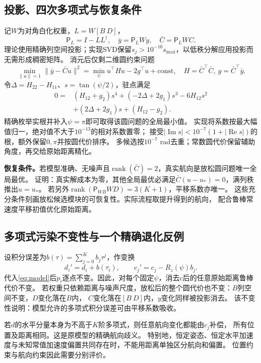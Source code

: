 \documentclass[11pt,a4paper]{ctexart}
\newcommand{\Proj}{\mathsf P}
\begin{document}
\subsection{投影、四次多项式与恢复条件}
记$W$为对角白化权重，$L=W[B\ D]$，
\begin{equation}
 \Proj_L=I-LL^\dagger,\quad \bar y=\Proj_LWy,\quad\bar C=\Proj_LWC.
\end{equation}
理论使用精确列空间投影；实现SVD保留$s_j>10^{-10}s_{\max}$，以低秩分解应用投影而无需形成稠密矩阵。
消元后仅剩二维圆约束问题
\begin{equation}
 \min_{\|u\|=1}\|\bar y-\bar C u\|^2
 =\min_\psi u^\top H u-2g^\top u+\mathrm{const},\quad
 H=\bar C^\top\bar C,\ g=\bar C^\top\bar y.
\end{equation}
令$\Delta=H_{22}-H_{11}$、$s=\tan(\psi/2)$，驻点满足
\begin{align}
0={}&(H_{12}+g_2)s^4+(-2\Delta+2g_1)s^3-6H_{12}s^2\nonumber\\
 &+(2\Delta+2g_1)s+(H_{12}-g_2).
\end{align}
精确枚举实根并补入$\psi=\pi$即可取得该圆问题的全局最小值。
实现将系数按最大幅值归一，绝对值不大于$10^{-13}$的相对系数置零；
接受$|\operatorname{Im}s|<10^{-7}(1+|\operatorname{Re}s|)$的根，额外保留$0,\pi$并按圆代价排序。
多候选按$10^{-7}$ rad去重；常数圆代价保留辅助角度，再交给原始距离精化。

\textbf{恢复条件。}若模型准确、无噪声且$\operatorname{rank}(\bar C)=2$，真实航向是放松圆问题唯一全局最优。
证明：真实解成本为零，其他全局最优必满足$\bar C(u-u_*)=0$，满列秩推出$u=u_*$。
若另外$\operatorname{rank}(\Proj_{WB}WD)=3(K+1)$，平移系数亦唯一。
这些充分条件刻画放松候选模块的可恢复性。实际流程取提升得到的航向，
配合鲁棒常速度平移初值优化原始距离。

\subsection{多项式污染不变性与一个精确退化反例}
设积分误差为$b(\tau)=\sum_{j=0}^{K}b_j\tau^j$，作变换
\begin{equation}
 d_i'=d_i+b(\tau_i),\qquad c_j'=c_j-R_z(\psi)b_j.
\end{equation}
代入\eqref{eq:model}后$p_i$逐点不变。因此，对每个固定$\psi$，消去$c$后的任意原始距离鲁棒代价不变。
若权重只依赖距离与噪声尺度，放松后的整个圆代价也不变：$B$列空间不变，$D$变化落在$B$内，
$C$变化落在$[B\ D]$内，$y$变化同样被投影消去。
该不变性说明：模型允许的多项式积分误差可由平移系数吸收。

若$d$的水平分量本身为不高于$K$阶多项式，则任意航向变化都能由$c_j$补偿，
所有位置及距离相同。这是原模型的精确航向歧义。
特别地，恒定姿态、恒定水平加速度与未知常值加速度偏置共同存在时，不能用距离单独区分航向和偏置。
位置约束与航向约束因此需要分别评价。
\end{document}
